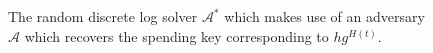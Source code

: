 \begin{figure}[t]
\begin{algorithm}[H]
    \caption{\label{alg.secret-key-adversary}
    The random discrete log solver $\mathcal{A}^*$
    which makes use of an adversary $\mathcal{A}$ which
    recovers the spending key corresponding to $h g^{H(t)}$.}
    \begin{algorithmic}[1]
            \State{}
        \EndFunction
    \end{algorithmic}
\end{algorithm}
\end{figure}
